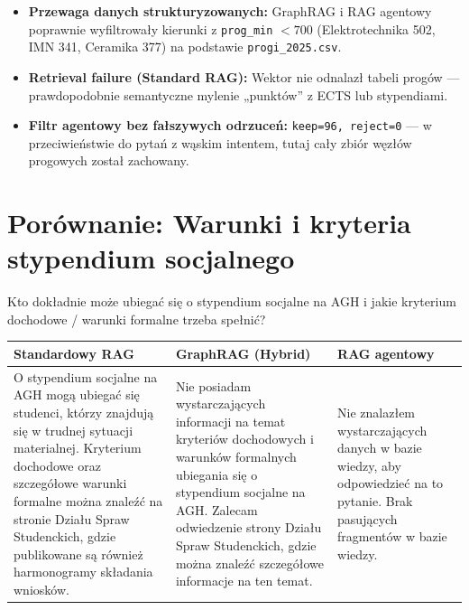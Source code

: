 \begin{tcolorbox}[colback=green!5!white,colframe=green!50!black,title=Wnioski i obserwacje]
    \begin{itemize}
        \item \textbf{Przewaga danych strukturyzowanych:} GraphRAG i RAG agentowy poprawnie wyfiltrowały kierunki z \texttt{prog\_min} $< 700$ (Elektrotechnika 502, IMN 341, Ceramika 377) na podstawie \texttt{progi\_2025.csv}.
        \item \textbf{Retrieval failure (Standard RAG):} Wektor nie odnalazł tabeli progów --- prawdopodobnie semantyczne mylenie „punktów'' z ECTS lub stypendiami.
        \item \textbf{Filtr agentowy bez fałszywych odrzuceń:} \texttt{keep=96, reject=0} --- w przeciwieństwie do pytań z wąskim intentem, tutaj cały zbiór węzłów progowych został zachowany.
    \end{itemize}
\end{tcolorbox}
\vspace{1em}

\newpage
\section*{Porównanie: Warunki i kryteria stypendium socjalnego}

\begin{tcolorbox}[colback=blue!5!white,colframe=blue!75!black,title=Pytanie użytkownika]
    Kto dokładnie może ubiegać się o stypendium socjalne na AGH i jakie kryterium dochodowe / warunki formalne trzeba spełnić?
\end{tcolorbox}

\noindent
\begin{tabularx}{\textwidth}{@{} >{\raggedright\arraybackslash}X >{\raggedright\arraybackslash}X >{\raggedright\arraybackslash}X @{}}
    \toprule
    \textbf{Standardowy RAG} & \textbf{GraphRAG (Hybrid)} & \textbf{RAG agentowy} \\
    \midrule
    \footnotesize O stypendium socjalne na AGH mogą ubiegać się studenci, którzy znajdują się w trudnej sytuacji materialnej. Kryterium dochodowe oraz szczegółowe warunki formalne można znaleźć na stronie Działu Spraw Studenckich, gdzie publikowane są również harmonogramy składania wniosków. & \footnotesize Nie posiadam wystarczających informacji na temat kryteriów dochodowych i warunków formalnych ubiegania się o stypendium socjalne na AGH. Zalecam odwiedzenie strony Działu Spraw Studenckich, gdzie można znaleźć szczegółowe informacje na ten temat. & \footnotesize Nie znalazłem wystarczających danych w bazie wiedzy, aby odpowiedzieć na to pytanie. Brak pasujących fragmentów w bazie wiedzy. \\
    \bottomrule
\end{tabularx}


